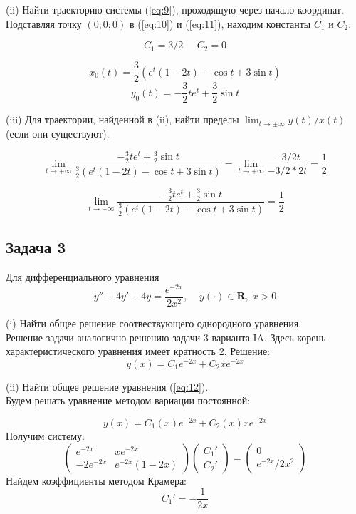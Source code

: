 \documentclass[a4paper, 12pt]{article}
\begin{document}
(ii) Найти траекторию системы (\ref{eq:9}), проходящую через начало координат.\\
Подставляя точку $(0;0;0)$ в (\ref{eq:10}) и (\ref{eq:11}), находим константы $C_1$ и $C_2$:

\[C_1 =3/2\;\;\;\;\; C_2 = 0\]

\[
x_0(t) = \frac 3 2 ( e^t\left(1-2t\right)-  \cos{t}+3\sin{t})\]\[
y_0(t) = - \frac 3 2 te^t+ \frac 3 2 \sin{t}
\]

(iii) Для траектории, найденной в (ii), найти пределы $\lim_{t\rightarrow\pm\infty}y(t)/x(t)$ (если они существуют).


\[\lim_{t\rightarrow+\infty}\frac{- \frac 3 2 te^t+ \frac 3 2 \sin{t}}{\frac 3 2 ( e^t\left(1-2t\right)-  \cos{t}+3\sin{t})}= \lim_{t\rightarrow+\infty}\frac{-3/2t}{-3/2 *2t}=\frac 1 2 \]

\[\lim_{t\rightarrow-\infty}\frac{- \frac 3 2 te^t+ \frac 3 2 \sin{t}}{\frac 3 2 ( e^t\left(1-2t\right)-  \cos{t}+3\sin{t})}=\frac 1 2\]


	\subsection {Задача 3}
Для дифференциального уравнения 
\begin{equation}
y''+4y'+4y=\frac{e^{-2x}}{2x^2}, \;\;\;\; y(\cdot)\in \textbf{R},\; x>0
\label{eq:12}
\end{equation}

(i) Найти общее решение соотвествующего однородного уравнения.\\
Решение задачи аналогично решению задачи 3 варианта IA. Здесь корень характеристического уравнения имеет кратность 2. Решение:
\[y(x) = C_1e^{-2x}+C_2xe^{-2x}\]

(ii) Найти общее решение уравнения (\ref{eq:12}).\\
Будем решать уравнение методом вариации постоянной:

\[y(x)= C_1(x)e^{-2x}+C_2(x)xe^{-2x}\]
Получим систему:
\[ \left(
\begin{array}{cc}
e^{-2x} & xe^{-2x} \\
-2e^{-2x} & e^{-2x}(1-2x)
\end{array}
\right) \left(
\begin{array}{c}
C_1' \\
C_2'
\end{array} 
\right)= \left(
\begin{array}{c}
0 \\
e^{-2x}/2x^2
\end{array}
\right) \]
Найдем коэффициенты методом Крамера:
\[C_1' = -\frac 1 {2x}\]
\end{document}
